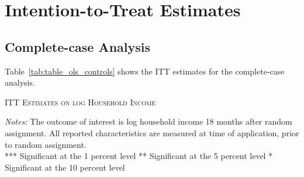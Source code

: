 
\section{Intention-to-Treat Estimates}

\subsection{Complete-case Analysis}

Table~\ref{tab:table_ols_controls} shows the ITT estimates for the complete-case analysis.

\begin{table}[t!]
\centering
\caption{\textsc{ITT Estimates on log Household Income}}



\label{tab:table_ols_controls}
\medskip
\raggedright
\footnotesize
\textit{Notes:} The outcome of interest is log household income 18 months after random assignment. All reported characteristics are measured at time of application, prior to random assignment. \\
*** Significant at the 1 percent level ** Significant at the 5 percent level * Significant at the 10 percent level
\end{table}
